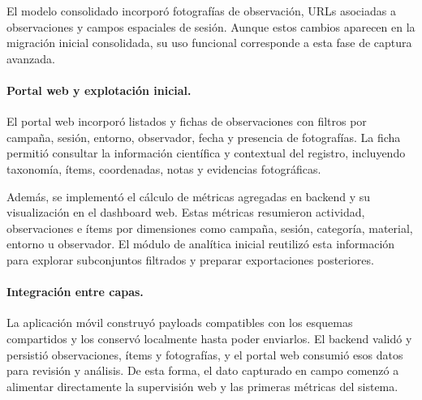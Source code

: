 El modelo consolidado incorporó fotografías de observación, URLs asociadas a
observaciones y campos espaciales de sesión. Aunque estos cambios aparecen en
la migración inicial consolidada, su uso funcional corresponde a esta fase de
captura avanzada.

\paragraph{Portal web y explotación inicial.}
El portal web incorporó listados y fichas de observaciones con filtros por
campaña, sesión, entorno, observador, fecha y presencia de fotografías. La ficha
permitió consultar la información científica y contextual del registro,
incluyendo taxonomía, ítems, coordenadas, notas y evidencias fotográficas.

Además, se implementó el cálculo de métricas agregadas en backend y su
visualización en el dashboard web. Estas métricas resumieron actividad,
observaciones e ítems por dimensiones como campaña, sesión, categoría, material,
entorno u observador. El módulo de analítica inicial reutilizó esta información
para explorar subconjuntos filtrados y preparar exportaciones posteriores.

\paragraph{Integración entre capas.}
La aplicación móvil construyó payloads compatibles con los esquemas compartidos
y los conservó localmente hasta poder enviarlos. El backend validó y persistió
observaciones, ítems y fotografías, y el portal web consumió esos datos para
revisión y análisis. De esta forma, el dato capturado en campo comenzó a
alimentar directamente la supervisión web y las primeras métricas del sistema.

